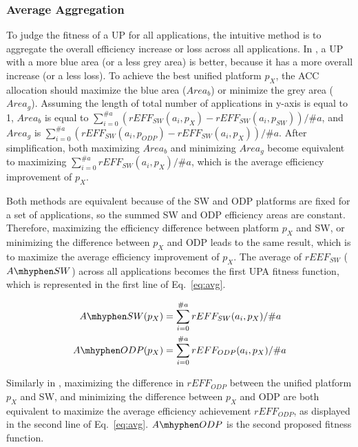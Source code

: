 \subsubsection{Average Aggregation}

To judge the fitness of a UP for all applications, the intuitive method is to aggregate the overall efficiency increase or loss across all applications.
In , a UP with a more blue area (or a less grey area) is better, because it has a more overall increase (or a less loss). 
To achieve the best unified platform $p_{X}$, the ACC allocation should maximize the blue area ($Area_{b}$) or minimize the grey area ($Area_{g}$). 
Assuming the length of total number of applications in y-axis is equal to 1, 
$Area_{b}$ is equal to $\sum_{i=0}^{\#a} ( rEFF_{SW}(a_{i}, p_{X}) -  rEFF_{SW}(a_{i}, p_{SW}) ) / \#a $, and $Area_{g}$ is $\sum_{i=0}^{\#a} ( rEFF_{SW}(a_{i}, p_{ODP}) -  rEFF_{SW}(a_{i}, p_{X}) ) / \#a $.
After simplification, both maximizing $Area_b$ and minimizing $Area_g$ become equivalent to maximizing $\sum_{i=0}^{\#a} rEFF_{SW}(a_{i}, p_{X}) / \#a$, which is the average efficiency improvement of $p_{X}$.  

Both methods are equivalent because of the SW and ODP platforms are fixed for a set of applications, so the summed SW and ODP efficiency areas are constant. 
Therefore, maximizing the efficiency difference between platform $p_{X}$ and SW, or minimizing the difference between $p_{X}$ and ODP leads to the same result, which is to maximize the average efficiency improvement of $p_{X}$. 
The average of $rEEF_{SW}$ ($A \mhyphen SW$) across all applications becomes the first UPA fitness function, which is represented in the first line of Eq.~\eqref{eq:avg}.

\vspace{-8pt}
\begin{equation}
\begin{split}
	A\mhyphen SW (p_{X}) &= \sum_{i=0}^{\#a} rEFF_{SW}(a_{i}, p_{X}) / \#a \\
	A\mhyphen ODP (p_{X}) &= \sum_{i=0}^{\#a} rEFF_{ODP}(a_{i}, p_{X}) / \#a
\label{eq:avg}
\end{split}
\end{equation}

Similarly in , maximizing the difference in $rEFF_{ODP}$ between the unified platform $p_{X}$ and SW, and minimizing the difference between $p_{X}$ and ODP are both equivalent to maximize the average efficiency achievement $rEFF_{ODP}$, as displayed in the second line of Eq.~\eqref{eq:avg}. $A \mhyphen ODP$ is the second proposed fitness function.